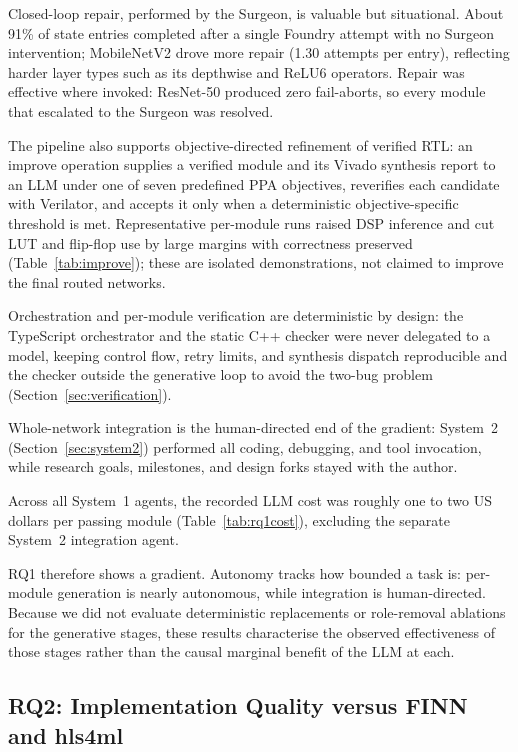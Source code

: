 \documentclass[acmtog,authorversion]{acmart}
\begin{document}
Closed-loop repair, performed by the Surgeon, is valuable but situational. About 91\% of state entries completed after a single Foundry attempt with no Surgeon intervention; MobileNetV2 drove more repair (1.30 attempts per entry), reflecting harder layer types such as its depthwise and ReLU6 operators. Repair was effective where invoked: ResNet-50 produced zero fail-aborts, so every module that escalated to the Surgeon was resolved.

The pipeline also supports objective-directed refinement of verified RTL: an improve operation supplies a verified module and its Vivado synthesis report to an LLM under one of seven predefined PPA objectives, reverifies each candidate with Verilator, and accepts it only when a deterministic objective-specific threshold is met. Representative per-module runs raised DSP inference and cut LUT and flip-flop use by large margins with correctness preserved (Table~\ref{tab:improve}); these are isolated demonstrations, not claimed to improve the final routed networks.

Orchestration and per-module verification are deterministic by design: the TypeScript orchestrator and the static C++ checker were never delegated to a model, keeping control flow, retry limits, and synthesis dispatch reproducible and the checker outside the generative loop to avoid the two-bug problem (Section~\ref{sec:verification}).

Whole-network integration is the human-directed end of the gradient: System~2 (Section~\ref{sec:system2}) performed all coding, debugging, and tool invocation, while research goals, milestones, and design forks stayed with the author.

Across all System~1 agents, the recorded LLM cost was roughly one to two US dollars per passing module (Table~\ref{tab:rq1cost}), excluding the separate System~2 integration agent.

RQ1 therefore shows a gradient. Autonomy tracks how bounded a task is: per-module generation is nearly autonomous, while integration is human-directed. Because we did not evaluate deterministic replacements or role-removal ablations for the generative stages, these results characterise the observed effectiveness of those stages rather than the causal marginal benefit of the LLM at each.

\subsection{RQ2: Implementation Quality versus FINN and hls4ml}\label{sec:rq2}
\end{document}
